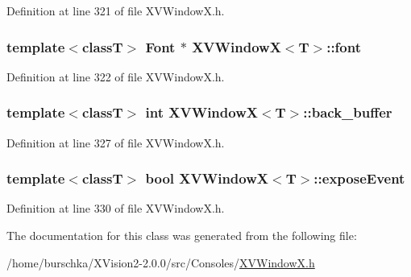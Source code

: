 Definition at line 321 of file XVWindow\-X.h.\label{XVWindowX_n19}
\hypertarget{class_XVWindowX_n19}{
\subsubsection[font]{\setlength{\rightskip}{0pt plus 5cm}template$<$classT$>$ Font $\ast$ XVWindow\-X$<$T$>$::font}}




Definition at line 322 of file XVWindow\-X.h.\label{XVWindowX_n20}
\hypertarget{class_XVWindowX_n20}{
\subsubsection[back_buffer]{\setlength{\rightskip}{0pt plus 5cm}template$<$classT$>$ int XVWindow\-X$<$T$>$::back\_\-buffer}}




Definition at line 327 of file XVWindow\-X.h.\label{XVWindowX_n21}
\hypertarget{class_XVWindowX_n21}{
\subsubsection[exposeEvent]{\setlength{\rightskip}{0pt plus 5cm}template$<$classT$>$ bool XVWindow\-X$<$T$>$::expose\-Event}}




Definition at line 330 of file XVWindow\-X.h.

The documentation for this class was generated from the following file:\begin{CompactItemize}
\item 
/home/burschka/XVision2-2.0.0/src/Consoles/\hyperlink{XVWindowX.h-source}{XVWindow\-X.h}\end{CompactItemize}
